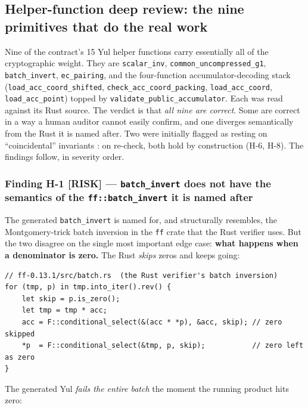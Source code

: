 \subsection{Helper-function deep review: the nine primitives that do the real work}
\label{sec:pr-helpers}

Nine of the contract's 15 Yul helper functions carry essentially all
of the cryptographic weight. They are \texttt{scalar\_inv},
\texttt{common\_\allowbreak{}uncompressed\_\allowbreak{}g1}, \texttt{batch\_invert},
\texttt{ec\_pairing}, and the four-function accumulator-decoding
stack (\texttt{load\_\allowbreak{}acc\_\allowbreak{}coord\_\allowbreak{}shifted},
\texttt{check\_\allowbreak{}acc\_\allowbreak{}coord\_\allowbreak{}packing}, \texttt{load\_acc\_coord},
\texttt{load\_acc\_point}) topped by
\texttt{validate\_\allowbreak{}public\_\allowbreak{}accumulator}. Each was read against its
Rust source. The verdict is that \emph{all nine are correct}. Some
are correct in a way a human auditor cannot easily confirm, and one
diverges semantically from the Rust it is named after. Two were
initially flagged as resting on ``coincidental'' invariants
: on re-check, both hold by construction (H-6,
H-8). The findings follow, in severity order.

\subsubsection*{Finding H-1 \textcolor{rustorange}{[RISK]} --- \texttt{batch\_invert} does not have the semantics of the \texttt{ff::batch\_invert} it is named after}

The generated \texttt{batch\_invert} is named for, and structurally
resembles, the Montgomery-trick batch inversion in the \texttt{ff} crate
that the Rust verifier uses. But the two disagree on the single most
important edge case: \textbf{what happens when a denominator is zero.}
The Rust \emph{skips} zeros and keeps going:

\begin{lstlisting}[style=rust]
// ff-0.13.1/src/batch.rs  (the Rust verifier's batch inversion)
for (tmp, p) in tmp.into_iter().rev() {
    let skip = p.is_zero();
    let tmp = tmp * acc;
    acc = F::conditional_select(&(acc * *p), &acc, skip); // zero skipped
    *p  = F::conditional_select(&tmp, p, skip);           // zero left as zero
}
\end{lstlisting}

The generated Yul \emph{fails the entire batch} the moment the running
product hits zero:

